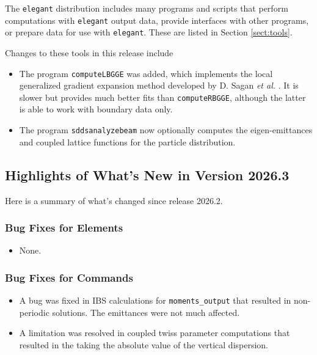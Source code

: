 \documentclass[11pt]{article}
\begin{document}
The {\tt elegant} distribution includes many programs and scripts that perform computations with {\tt elegant}
output data, provide interfaces with other programs, or prepare data for use with {\tt elegant}. These
are listed in Section \ref{sect:tools}. 

Changes to these tools in this release include
\begin{itemize}
\item The program \verb|computeLBGGE| was added, which implements the local generalized gradient expansion
  method developed by D. Sagan {\em et al.} \cite{sagan:ipac23-wepl015}. It is slower but provides much better fits
  than \verb|computeRBGGE|, although the latter is able to work with boundary data only.
\item The program \verb|sddsanalyzebeam| now optionally computes the eigen-emittances and coupled lattice
  functions for the particle distribution.
\end{itemize}

\subsection{Highlights of What's New in Version 2026.3}

Here is a summary of what's changed since release 2026.2.

\subsubsection{Bug Fixes for Elements}

\begin{itemize}
  \item None.
\end{itemize}

\subsubsection{Bug Fixes for Commands}
\begin{itemize}
\item A bug was fixed in IBS calculations for \verb|moments_output| that resulted in non-periodic solutions. The emittances were not
  much affected.
\item A limitation was resolved in coupled twiss parameter computations that resulted in the taking the absolute value of the vertical dispersion.
\end{itemize}
\end{document}
